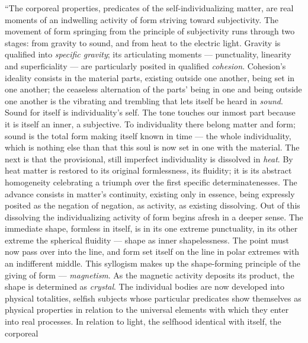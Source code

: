 \documentclass[12pt,a4paper]{book}
\begin{document}
``The corporeal properties, predicates of the self-individualizing matter, are real moments of an indwelling activity
of form striving toward subjectivity. The movement of form springing from the principle of subjectivity runs through
two stages: from gravity to sound, and from heat to the electric light. Gravity is qualified into \emph{specific
gravity}; its articulating moments --- punctuality, linearity and superficiality --- are particularly posited in
qualified \emph{cohesion}. Cohesion's ideality consists in the material parts, existing outside one another, being set
in one another; the ceaseless alternation of the parts' being in one and being outside one another is the vibrating
and trembling that lets itself be heard in \emph{sound}. Sound for itself is individuality's self. The tone touches our
inmost part because it is itself an inner, a
subjective. To individuality there belong matter and form; sound is the total form making itself known in time --- the
whole individuality, which is nothing else than that this soul is now set in one with the material. The next is that
the provisional, still imperfect individuality is dissolved in \emph{heat}. By heat matter is restored to its original
formlessness, its fluidity; it is its abstract homogeneity celebrating a triumph over the first specific
determinatenesses. The advance consists in matter's continuity, existing only in essence, being expressly posited as
the negation of negation, as activity, as existing dissolving. Out of this dissolving the individualizing activity of
form begins afresh in a deeper sense. The immediate shape, formless in itself, is in its one extreme punctuality, in
its other extreme the spherical fluidity --- shape as inner shapelessness. The point must now pass over into the line,
and form set itself on the line in polar extremes with an indifferent middle. This syllogism makes up the
shape-forming principle of the giving of form --- \emph{magnetism}. As the magnetic activity deposits its product, the
shape is determined as \emph{crystal}. The individual bodies are now developed into physical totalities, selfish
subjects whose particular predicates show themselves as physical properties in relation to the universal elements with
which they enter into real processes. In relation to light, the selfhood identical with itself, the corporeal
\end{document}
